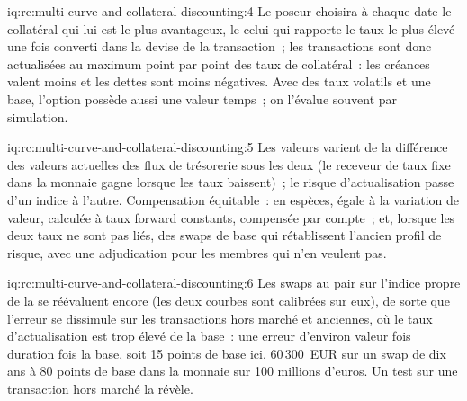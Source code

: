 \begin{solution}{iq:rc:multi-curve-and-collateral-discounting:4}
Le poseur choisira à chaque date le collatéral qui lui est le plus avantageux, le
celui qui rapporte le taux le plus élevé une fois converti dans la devise de la transaction~; les transactions
sont donc actualisées au maximum point par point des taux de collatéral~: les créances
valent moins et les dettes sont moins négatives. Avec des taux volatils et une base, l'option
possède aussi une valeur temps~; on l'évalue souvent par simulation.
\end{solution}

\begin{solution}{iq:rc:multi-curve-and-collateral-discounting:5}
Les valeurs varient de la différence des valeurs actuelles des flux de trésorerie sous
les deux  (le receveur de taux fixe dans la monnaie gagne lorsque les taux baissent)~;
le risque d'actualisation passe d'un indice à l'autre. Compensation équitable~: en espèces,
égale à la variation de valeur, calculée à taux forward constants, compensée par compte~;
et, lorsque les deux taux ne sont pas liés, des swaps de base qui rétablissent l'ancien profil
de risque, avec une adjudication pour les membres qui n'en veulent pas.
\end{solution}

\begin{solution}{iq:rc:multi-curve-and-collateral-discounting:6}
Les swaps au pair sur l'indice propre de la  se réévaluent encore (les deux courbes sont
calibrées sur eux), de sorte que l'erreur se dissimule sur les transactions hors marché et anciennes,
où le taux d'actualisation est trop élevé de la base~: une erreur d'environ valeur
fois duration fois la base, soit 15 points de base ici, 60\,300~EUR sur un swap de dix ans
à 80 points de base dans la monnaie sur 100 millions d'euros. Un test sur une transaction hors marché
la révèle.
\end{solution}
